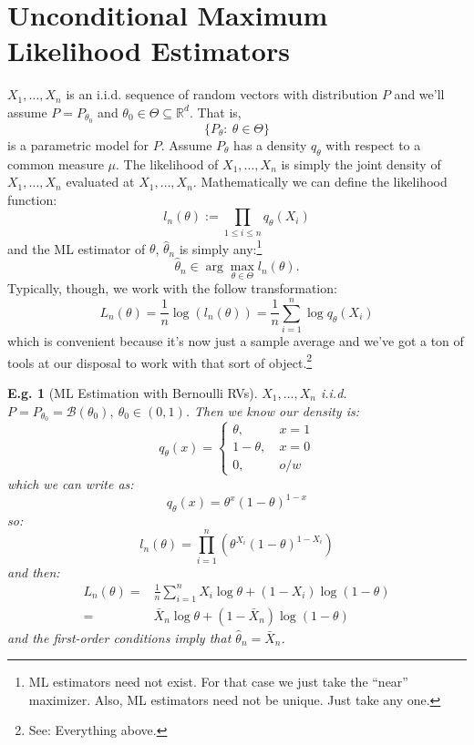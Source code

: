 \documentclass{tufte-book}
\theoremstyle{mytheoremstyle}
\theoremstyle{mylemstyle}
\theoremstyle{mydefstyle}
\newtheorem*{ex}{E.g.}
\begin{document}
\section{Unconditional Maximum Likelihood Estimators}
 \(X_1,\dots,X_n\) is an i.i.d. sequence of random vectors with distribution \(P\) and we'll assume \(P=P_{\theta_0}\) and \(\theta_0 \in \Theta \subseteq \mathbb{R}^d\). That is,
	\[\{P_\theta:\ \theta \in \Theta\}\]
is a parametric model for \(P\). Assume \(P_\theta\) has a density \(q_\theta\) with respect to a common measure \(\mu\). The likelihood of \(X_1,\dots,X_n\) is simply the joint density of \(X_1,\dots, X_n\) evaluated at \(X_1, \dots, X_n\). Mathematically we can define the likelihood function:
	\[l_n (\theta) := \prod_{1 \le i \le n} q_\theta(X_i)\]
and the ML estimator of \(\theta\), \(\hat{\theta}_n\) is simply any:\footnote{ML estimators need not exist. For that case we just take the ``near'' maximizer. Also, ML estimators need not be unique. Just take any one.}
	\[\hat{\theta}_n \in \arg \max_{\theta \in \Theta} l_n(\theta)\text{.}\]
Typically, though, we work with the follow transformation:
	\[L_n(\theta) = \frac{1}{n} \log(l_n(\theta)) = \frac{1}{n}\sum_{i=1}^n \log q_\theta(X_i)\]
which is convenient because it's now just a sample average and we've got a ton of tools at our disposal to work with that sort of object.\footnote{See: Everything above.}
\begin{ex}[ML Estimation with Bernoulli RVs] \(X_1, \dots, X_n\) i.i.d. \(P = P_{\theta_0} = \mathcal{B}(\theta_0),\ \theta_0 \in (0,1)\). Then we know our density is:
	\[ q_\theta (x) = \begin{cases} \theta,\   &x = 1 \\ 1-\theta,\ &x = 0 \\0,\ &o/w \end{cases} \]
which we can write as:
	\[q_\theta(x) = \theta^x (1-\theta)^{1-x}\]
so:
	\[l_n(\theta) = \prod_{i=1}^n \left(\theta^{X_i} (1-\theta)^{1-X_i}\right)\]
and then:
	\begin{align*}
		L_n(\theta) =& \frac{1}{n} \sum_{i=1}^n X_i \log \theta + (1-X_i)\log(1-\theta) \\
				=& \bar{X}_n \log \theta + (1-\bar{X}_n)\log(1-\theta)
	\end{align*}
and the first-order conditions imply that \(\hat{\theta}_n = \bar{X}_n\).
\end{ex}
\end{document}
